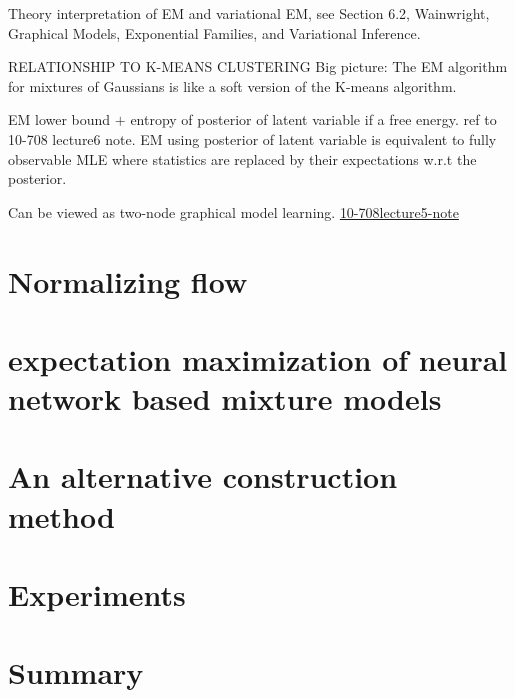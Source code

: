 \begin{remark}
Theory interpretation of EM and variational EM, see Section 6.2, Wainwright, Graphical Models, Exponential Families, and Variational Inference.
\end{remark}


\begin{remark}
  RELATIONSHIP TO K-MEANS CLUSTERING
  Big picture: The EM algorithm for mixtures of Gaussians is like a soft version of the K-means algorithm.
\end{remark}

\begin{remark}
  EM lower bound $+$ entropy of posterior of latent variable if a free energy. ref to 10-708 lecture6 note.
  EM using posterior of latent variable is equivalent to fully observable MLE where statistics are replaced by their expectations w.r.t the posterior.
\end{remark}

Can be viewed as two-node graphical model learning. \href{https://sailinglab.github.io/pgm-spring-2019/notes/lecture-05/}{10-708lecture5-note}
\section{Normalizing flow}

\section{expectation maximization of neural network based mixture models}

\section{An alternative construction method}

\section{Experiments}


\section{Summary}

